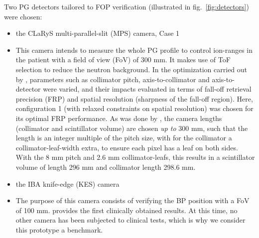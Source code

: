 \documentclass[a4paper,english]{article}
\begin{document}
Two PG detectors tailored to FOP verification (illustrated in fig.~\ref{fig:detectors}) were chosen:
\begin{itemize}[noitemsep]
\item the CLaRyS multi-parallel-slit (MPS) camera, Case 1 \citep{Pinto2014a}
\item[] This camera intends to measure the whole PG profile to control ion-ranges in the patient with a field of view (FoV) of 300 mm. It makes use of ToF selection to reduce the neutron background. In the optimization carried out by \cite{Pinto2014a}, parameters such as collimator pitch, axis-to-collimator and axis-to-detector were varied, and their impacts evaluated in terms of fall-off retrieval precision (FRP) and spatial resolution (sharpness of the fall-off region). Here, configuration 1 (with relaxed constraints on spatial resolution) was chosen for its optimal FRP performance. As was done by \cite{Pinto2014a}, the camera lengths (collimator and scintillator volume) are chosen \emph{up to} 300 mm, such that the length is an integer multiple of the pitch size, with for the collimator a collimator-leaf-width extra, to ensure each pixel has a leaf on both sides. With the 8 mm pitch and 2.6 mm collimator-leafs, this results in a scintillator volume of length 296 mm and collimator length 298.6 mm.
\item the IBA knife-edge (KES) camera \citep{Perali2014,Sterpin2015}
\item[] The purpose of this camera consists of verifying the BP position with a FoV of 100 mm. \cite{Richter2016} provides the first clinically obtained results. At this time, no other camera has been subjected to clinical tests, which is why we consider this prototype a benchmark.
\end{itemize}
\end{document}
